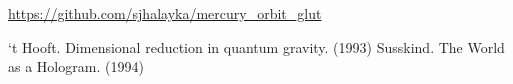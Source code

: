 \documentclass[12pt]{article}
\begin{document}
\url{https://github.com/sjhalayka/mercury_orbit_glut}











\begin{thebibliography}{9}

 `t Hooft. Dimensional reduction in quantum gravity. (1993)
 Susskind. The World as a Hologram. (1994)



\end{thebibliography}
\end{document}
